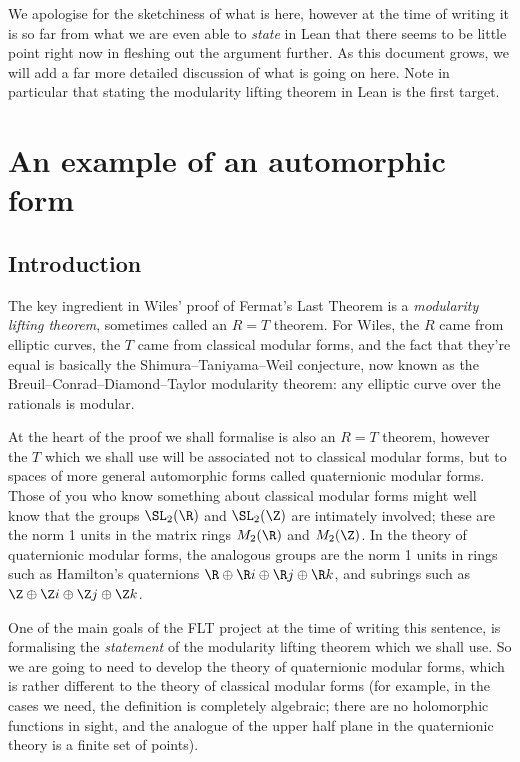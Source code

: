 We apologise for the sketchiness of what is here, however at the time of writing it is so far from what we are even able to \emph{state} in Lean that there seems to be little point right now in fleshing out the argument further. As this document grows, we will add a far more detailed discussion of what is going on here. Note in particular that stating the modularity lifting theorem in Lean is the first target.


\chapter{An example of an automorphic form}

\section{Introduction}

The key ingredient in Wiles' proof of Fermat's Last Theorem is a \emph{modularity lifting theorem},
sometimes called an $R=T$ theorem. For Wiles, the $R$ came from elliptic curves, the $T$ came from
classical modular forms, and the fact that they're equal is basically the Shimura--Taniyama--Weil
conjecture, now known as the Breuil--Conrad--Diamond--Taylor modularity theorem: any elliptic
curve over the rationals is modular.

At the heart of the proof we shall formalise is also an $R=T$ theorem, however the $T$ which we
shall use will be associated not to classical modular forms, but to spaces of more general
automorphic forms called quaternionic modular forms. Those of you who know something about
classical modular forms might well know that the groups $\SL_2(\R)$ and $\SL_2(\Z)$ are
intimately involved; these are the norm 1 units in the matrix rings $M_2(\R)$ and $M_2(\Z)$.
In the theory of quaternionic modular forms, the analogous groups are the norm 1 units
in rings such as Hamilton's quaternions $\R\oplus\R i\oplus\R j\oplus\R k$, and subrings
such as $\Z\oplus\Z i\oplus\Z j\oplus\Z k$.

One of the main goals of the FLT project at the time of writing this sentence, is formalising
the \emph{statement} of the modularity lifting theorem which we shall use. So we are going
to need to develop the theory of quaternionic modular forms, which is rather different
to the theory of classical modular forms (for example, in the cases we need, the definition
is completely algebraic; there are no holomorphic functions in sight, and the analogue
of the upper half plane in the quaternionic theory is a finite set of points).

